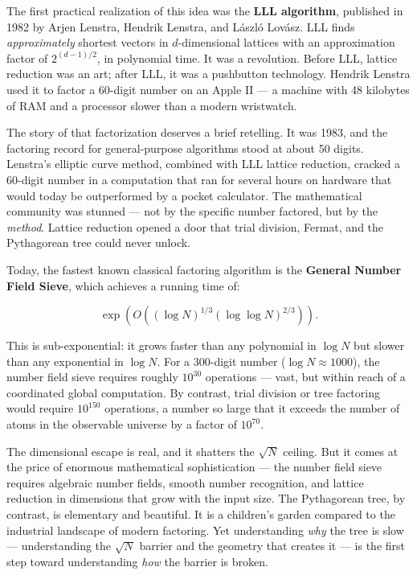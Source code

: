 The first practical realization of this idea was the \textbf{LLL algorithm}, published in 1982 by Arjen Lenstra, Hendrik Lenstra, and László Lovász. LLL finds \emph{approximately} shortest vectors in \(d\)-dimensional lattices with an approximation factor of \(2^{(d-1)/2}\), in polynomial time. It was a revolution. Before LLL, lattice reduction was an art; after LLL, it was a pushbutton technology. Hendrik Lenstra used it to factor a 60-digit number on an Apple II --- a machine with 48 kilobytes of RAM and a processor slower than a modern wristwatch.

The story of that factorization deserves a brief retelling. It was 1983, and the factoring record for general-purpose algorithms stood at about 50 digits. Lenstra's elliptic curve method, combined with LLL lattice reduction, cracked a 60-digit number in a computation that ran for several hours on hardware that would today be outperformed by a pocket calculator. The mathematical community was stunned --- not by the specific number factored, but by the \emph{method}. Lattice reduction opened a door that trial division, Fermat, and the Pythagorean tree could never unlock.

Today, the fastest known classical factoring algorithm is the \textbf{General Number Field Sieve}, which achieves a running time of:

\[\exp\!\left(O\!\left((\log N)^{1/3}(\log \log N)^{2/3}\right)\right).\]

This is sub-exponential: it grows faster than any polynomial in \(\log N\) but slower than any exponential in \(\log N\). For a 300-digit number (\(\log N \approx 1000\)), the number field sieve requires roughly \(10^{30}\) operations --- vast, but within reach of a coordinated global computation. By contrast, trial division or tree factoring would require \(10^{150}\) operations, a number so large that it exceeds the number of atoms in the observable universe by a factor of \(10^{70}\).

The dimensional escape is real, and it shatters the \(\sqrt{N}\) ceiling. But it comes at the price of enormous mathematical sophistication --- the number field sieve requires algebraic number fields, smooth number recognition, and lattice reduction in dimensions that grow with the input size. The Pythagorean tree, by contrast, is elementary and beautiful. It is a children's garden compared to the industrial landscape of modern factoring. Yet understanding \emph{why} the tree is slow --- understanding the \(\sqrt{N}\) barrier and the geometry that creates it --- is the first step toward understanding \emph{how} the barrier is broken.


